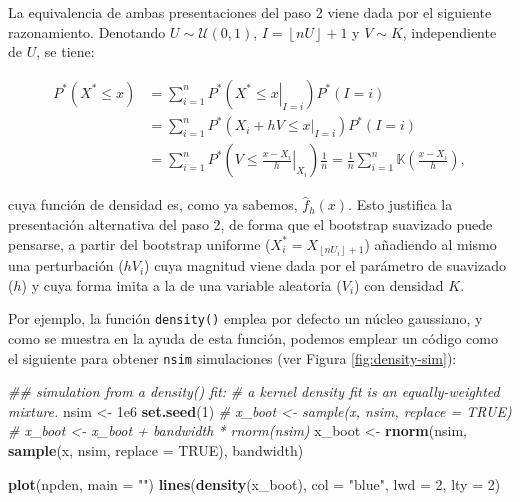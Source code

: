 \documentclass[
]{book}
\newenvironment{Shaded}{\begin{snugshade}}{\end{snugshade}}
\newcommand{\CommentTok}[1]{\textcolor[rgb]{0.56,0.35,0.01}{\textit{#1}}}
\newcommand{\DataTypeTok}[1]{\textcolor[rgb]{0.13,0.29,0.53}{#1}}
\newcommand{\DecValTok}[1]{\textcolor[rgb]{0.00,0.00,0.81}{#1}}
\newcommand{\FloatTok}[1]{\textcolor[rgb]{0.00,0.00,0.81}{#1}}
\newcommand{\KeywordTok}[1]{\textcolor[rgb]{0.13,0.29,0.53}{\textbf{#1}}}
\newcommand{\NormalTok}[1]{#1}
\newcommand{\OtherTok}[1]{\textcolor[rgb]{0.56,0.35,0.01}{#1}}
\newcommand{\StringTok}[1]{\textcolor[rgb]{0.31,0.60,0.02}{#1}}
\theoremstyle{break}
\theoremstyle{definition}
\theoremstyle{definition}
\theoremstyle{definition}
\theoremstyle{remark}
\begin{document}
La equivalencia de ambas presentaciones del paso 2 viene dada por el
siguiente razonamiento. Denotando \(U\sim \mathcal{U}\left( 0,1 \right)\),
\(I=\left\lfloor nU\right\rfloor +1\) y \(V\sim K\), independiente de \(U\), se
tiene:

\[\begin{aligned}
P^{\ast}\left( X^{\ast}\leq x \right) &= \sum_{i=1}^{n}P^{\ast}\left(
\left. X^{\ast}\leq x\right\vert _{I=i} \right) P^{\ast}\left( I=i \right) \\
&= \sum_{i=1}^{n}P^{\ast}\left( \left. X_i+hV\leq x\right\vert
_{I=i} \right) P^{\ast}\left( I=i \right) \\
&= \sum_{i=1}^{n}P^{\ast}\left( \left. V\leq \frac{x-X_i}{h}
\right\vert _{X_i} \right) \frac{1}{n}=\frac{1}{n}\sum_{i=1}^{n}\mathbb{K}
\left( \frac{x-X_i}{h} \right),
\end{aligned}\]

cuya función de densidad es, como ya sabemos, \(\hat{f}_{h}\left( x \right)\). Esto justifica la presentación alternativa del paso 2, de
forma que el bootstrap suavizado puede pensarse, a partir del bootstrap
uniforme (\(X_i^{\ast}=X_{\left\lfloor nU_i\right\rfloor +1}\))
añadiendo al mismo una perturbación (\(hV_i\)) cuya magnitud viene dada
por el parámetro de suavizado (\(h\)) y cuya forma imita a la de una
variable aleatoria (\(V_i\)) con densidad \(K\).

Por ejemplo, la función \texttt{density()} emplea por defecto un núcleo
gaussiano, y como se muestra en la ayuda de esta función,
podemos emplear un código como el siguiente para obtener
\texttt{nsim} simulaciones (ver Figura \ref{fig:density-sim}):

\begin{Shaded}
\begin{Highlighting}[]
\CommentTok{## simulation from a density() fit:}
\CommentTok{# a kernel density fit is an equally-weighted mixture.}
\NormalTok{nsim <-}\StringTok{ }\FloatTok{1e6}
\KeywordTok{set.seed}\NormalTok{(}\DecValTok{1}\NormalTok{)}
\CommentTok{# x_boot <- sample(x, nsim, replace = TRUE)}
\CommentTok{# x_boot <- x_boot + bandwidth * rnorm(nsim)}
\NormalTok{x_boot <-}\StringTok{ }\KeywordTok{rnorm}\NormalTok{(nsim, }\KeywordTok{sample}\NormalTok{(x, nsim, }\DataTypeTok{replace =} \OtherTok{TRUE}\NormalTok{), bandwidth)}

\KeywordTok{plot}\NormalTok{(npden, }\DataTypeTok{main =} \StringTok{""}\NormalTok{)}
\KeywordTok{lines}\NormalTok{(}\KeywordTok{density}\NormalTok{(x_boot), }\DataTypeTok{col =} \StringTok{"blue"}\NormalTok{, }\DataTypeTok{lwd =} \DecValTok{2}\NormalTok{, }\DataTypeTok{lty =} \DecValTok{2}\NormalTok{)}
\end{Highlighting}
\end{Shaded}
\end{document}
